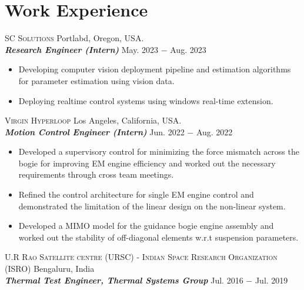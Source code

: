 \documentclass[letterpaper,10pt]{article}
\begin{document}
\section{Work Experience}
\noindent \textsc{SC Solutions} \hfill Portlabd, Oregon, USA.\\
\vspace{3pt}
\textbf{\textit{Research Engineer (Intern)}} \hfill May. 2023 $-$ Aug. 2023
\begin{itemize}[noitemsep,nolistsep,leftmargin=0.25in,label={--}]
    \item Developing computer vision deployment pipeline and estimation algorithms for parameter estimation using vision data.
    \item Deploying realtime control systems using windows real-time extension.
\end{itemize}
\vspace{10pt}
\noindent \textsc{Virgin Hyperloop} \hfill Los Angeles, California, USA.\\
\vspace{3pt}
\textbf{\textit{Motion Control Engineer (Intern)}} \hfill Jun. 2022 $-$ Aug. 2022
\begin{itemize}[noitemsep,nolistsep,leftmargin=0.25in,label={--}]
    \item Developed a supervisory control for minimizing the force mismatch
across the bogie for improving EM engine efficiency and worked out the necessary
requirements through cross team meetings.
\item Refined the control architecture for single EM engine control and
demonstrated the limitation of the linear design on the non-linear system.
\item Developed a MIMO model for the guidance bogie engine assembly and worked
out the stability of off-diagonal elements w.r.t suspension parameters.
\end{itemize}
\vspace{10pt}
\noindent \textsc{U.R Rao Satellite centre (URSC) - Indian Space Research
Organization (ISRO)} \hfill Bengaluru, India \\
\vspace{3pt}
\textbf{\textit{Thermal Test Engineer, Thermal Systems Group}} \hfill Jul. 2016 $-$ Jul. 2019
\end{document}
